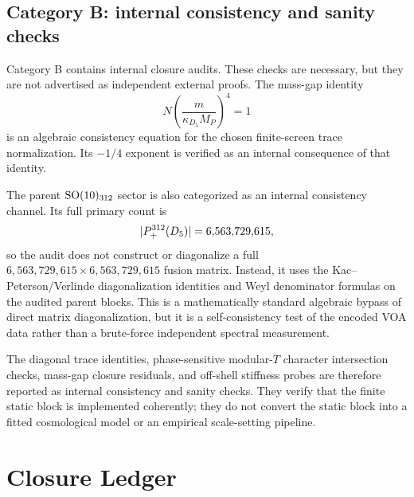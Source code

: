 \documentclass[11pt]{article}
\newcommand{\SO}{\mathrm{SO}}
\begin{document}
\subsection{Category B: internal consistency and sanity checks}

Category B contains internal closure audits.  These checks are necessary, but they are not advertised as independent external proofs.  The mass-gap identity
\begin{equation}
  N\left(\frac{m}{\kappa_{D_5}M_P}\right)^4=1
\end{equation}
is an algebraic consistency equation for the chosen finite-screen trace normalization.  Its \(-1/4\) exponent is verified as an internal consequence of that identity.

The parent \(\SO(10)_{\benchmarkParentLevel}\) sector is also categorized as an internal consistency channel.  Its full primary count is
\begin{equation}
  |P_+^{312}(D_5)|=6{,}563{,}729{,}615,
\end{equation}
so the audit does not construct or diagonalize a full \(6{,}563{,}729{,}615\times6{,}563{,}729{,}615\) fusion matrix.  Instead, it uses the Kac--Peterson/Verlinde diagonalization identities and Weyl denominator formulas on the audited parent blocks.  This is a mathematically standard algebraic bypass of direct matrix diagonalization, but it is a self-consistency test of the encoded VOA data rather than a brute-force independent spectral measurement.

The diagonal trace identities, phase-sensitive modular-\(T\) character intersection checks, mass-gap closure residuals, and off-shell stiffness probes are therefore reported as internal consistency and sanity checks.  They verify that the finite static block is implemented coherently; they do not convert the static block into a fitted cosmological model or an empirical scale-setting pipeline.

\section{Closure Ledger}
\end{document}
